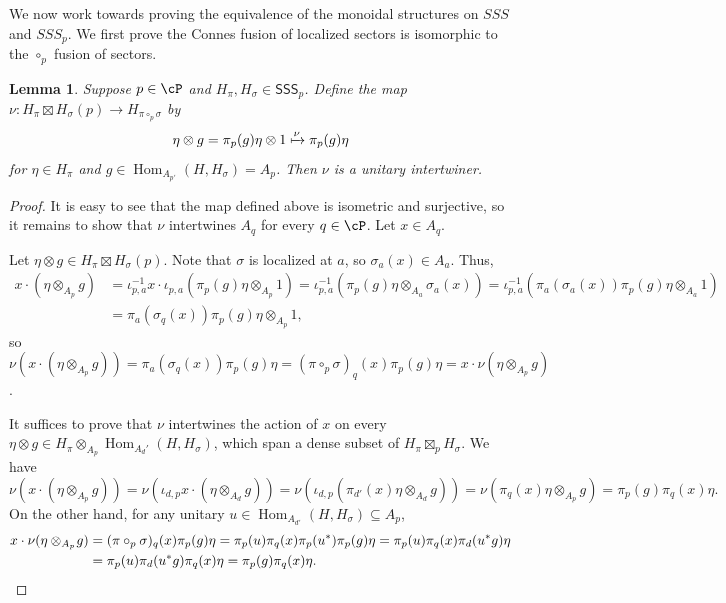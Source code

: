 \documentclass[11pt,reqno]{amsart}
\DeclareMathOperator{\Hom}{Hom}
\newcommand{\SSS}{\mathsf{SSS}}
\numberwithin{equation}{section}
\theoremstyle{plain}
\newtheorem{lemma}[equation]{Lemma}
\theoremstyle{definition}
\begin{document}
We now work towards proving the equivalence of the monoidal structures on $SSS$ and $SSS_p$. We first prove the Connes fusion of localized sectors is isomorphic to the $\circ_p$ fusion of sectors.

\begin{lemma}
    Suppose $p\in{\cP}$ and $H_\pi,H_\sigma\in\SSS_p$. Define the map $\nu:H_\pi\boxtimes H_\sigma(p)\to H_{\pi\circ_p\sigma}$ by
    \[
    \eta\otimes g=\pi_p(g)\eta\otimes 1\xmapsto{\nu} \pi_p(g)\eta
    \]
    for $\eta\in H_\pi$ and $g\in\Hom_{A_{p'}}(H,H_\sigma)=A_p$. Then $\nu$ is a unitary intertwiner.
\end{lemma}

\begin{proof}
    It is easy to see that the map defined above is isometric and surjective, so it remains to show that $\nu$ intertwines $A_q$ for every $q\in{\cP}$. Let $x\in A_q$.
    \item[\underline{Case 1: There exists $a\in{\cP}$ with $a\geq p,q$.}] Let $\eta\otimes g\in H_\pi\boxtimes H_\sigma(p)$. Note that $\sigma$ is localized at $a$, so $\sigma_a(x)\in A_a$. Thus,
    \begin{align*}
        x\cdot(\eta\otimes_{A_p}\! g)
        &=\iota_{p,a}^{-1}x\cdot\iota_{p,a}(\pi_p(g)\eta\otimes_{A_p}\! 1)
        =\iota_{p,a}^{-1}(\pi_p(g)\eta\otimes_{A_a}\!\sigma_a(x))
        =\iota_{p,a}^{-1}(\pi_a(\sigma_a(x))\pi_p(g)\eta\otimes_{A_a}\!1) \\
        &=\pi_a(\sigma_q(x))\pi_p(g)\eta\otimes_{A_p}\!1,
    \end{align*}
    so $\nu(x\cdot(\eta\otimes_{A_p}\!g))=\pi_a(\sigma_q(x))\pi_p(g)\eta=(\pi\circ_p\sigma)_q(x)\pi_p(g)\eta
        =x\cdot\nu(\eta\otimes_{A_p}\! g)$.

    \item[\underline{Case 2: There exists $d\in{\cP}$ with $d\leq p,q'$.}] It suffices to prove that $\nu$ intertwines the action of $x$ on every $\eta \otimes g \in H_\pi \otimes_{A_p} \Hom_{A_d'}(H, H_\sigma)$, which span a dense subset of $H_\pi \boxtimes_p H_\sigma$. We have
    \[
    \nu(x\cdot(\eta\otimes_{A_p}\! g))=\nu(\iota_{d,p}x\cdot(\eta\otimes_{A_d}\!g))=\nu(\iota_{d,p}(\pi_{d'}(x)\eta\otimes_{A_d}\!g))=\nu(\pi_q(x)\eta\otimes_{A_p}g)=\pi_p(g)\pi_q(x)\eta.
    \]
    On the other hand, for any unitary $u\in\Hom_{A_{d'}}(H,H_\sigma)\subseteq A_p$,
    \begin{align*}
        x\cdot\nu(\eta\otimes_{A_p}\!g)
        &=(\pi\circ_p\sigma)_q(x)\pi_p(g)\eta
        =\pi_p(u)\pi_q(x)\pi_p(u^*)\pi_p(g)\eta 
        =\pi_p(u)\pi_q(x)\pi_d(u^*g)\eta \\
        &=\pi_p(u)\pi_d(u^*g)\pi_q(x)\eta
        =\pi_p(g)\pi_q(x)\eta.
        \qedhere
    \end{align*}
\end{proof}
\end{document}
